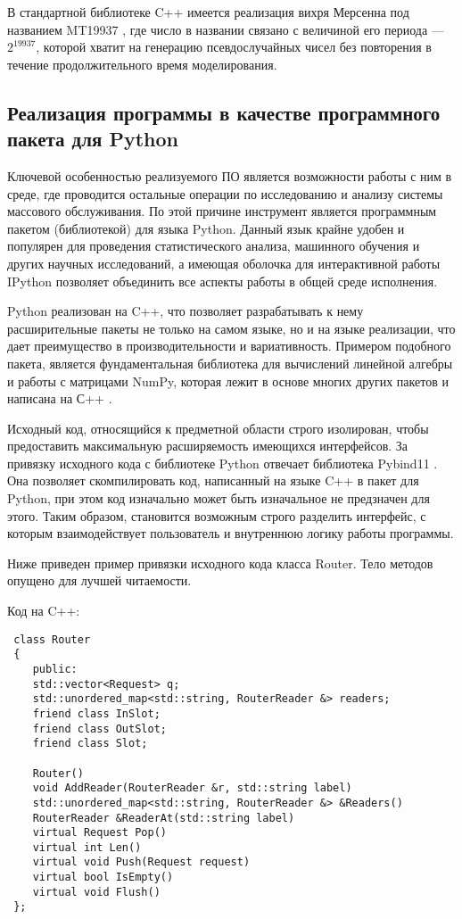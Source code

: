  В стандартной библиотеке C++ имеется реализация вихря Мерсенна под названием MT19937 \cite{mersenn}, где число в названии связано с величиной его периода --- $2^{19937}$, которой хватит на генерацию псевдослучайных чисел без повторения в течение продолжительного время моделирования.
 
 \subsection{Реализация программы в качестве программного пакета для Python}
 Ключевой особенностью реализуемого ПО является возможности работы с ним в среде, где проводится остальные операции по исследованию и анализу системы массового обслуживания. По этой причине инструмент является программным пакетом (библиотекой) для языка Python. Данный язык крайне удобен и популярен для проведения статистического анализа, машинного обучения и других научных исследований, а имеющая оболочка для интерактивной работы IPython позволяет объединить все аспекты работы в общей среде исполнения.
 
 Python реализован на C++, что позволяет разрабатывать к нему расширительные пакеты не только на самом языке, но и на языке реализации, что дает преимущество в производительности и вариативность. Примером подобного пакета, является фундаментальная библиотека для вычислений линейной алгебры и работы с матрицами NumPy, которая лежит в основе многих других пакетов и написана на С++ \cite{numpy}.
 
 Исходный код, относящийся к предметной области строго изолирован, чтобы предоставить максимальную расширяемость имеющихся интерфейсов. За привязку исходного кода с библиотеке Python отвечает библиотека Pybind11 \cite{pybind}. Она позволяет скомпилировать код, написанный на языке C++ в пакет для Python, при этом код изначально может быть изначальное не предзначен для этого. Таким образом, становится возможным строго разделить интерфейс, с которым взаимодействует пользователь и внутреннюю логику работы программы.
 
 Ниже приведен пример привязки исходного кода класса Router. Тело методов опущено для лучшей читаемости.
 
 Код на C++:
 \begin{lstlisting}
 class Router
 {
 	public:
 	std::vector<Request> q;
 	std::unordered_map<std::string, RouterReader &> readers;
 	friend class InSlot;
 	friend class OutSlot;
 	friend class Slot;
 	
 	Router()
 	void AddReader(RouterReader &r, std::string label)
 	std::unordered_map<std::string, RouterReader &> &Readers()
 	RouterReader &ReaderAt(std::string label)
 	virtual Request Pop()
 	virtual int Len()
 	virtual void Push(Request request)
 	virtual bool IsEmpty()	
 	virtual void Flush()
 };
 \end{lstlisting}

